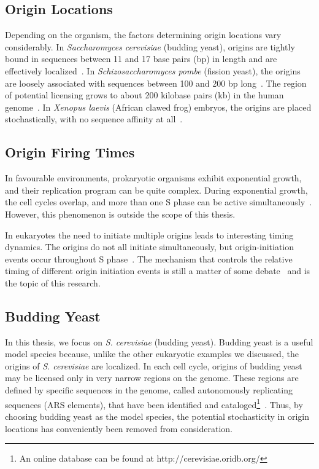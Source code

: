 	
		\subsection{Origin Locations}
		\label{subsec:OriginLocations}
		
		Depending on the organism, the factors determining origin locations vary considerably.
		In \emph{Saccharomyces cerevisiae} (budding yeast), origins are tightly bound in sequences between 11 and 17 base pairs (bp) in length and are effectively localized~\cite{ScottsPaper}.
		In \emph{Schizosaccharomyces pombe} (fission yeast), the origins are loosely associated with sequences between 100 and 200 bp long~\cite{OriginsReview}.
		The region of potential licensing grows to about 200 kilobase pairs (kb) in the human genome~\cite{HumanGenome}.
		In \emph{Xenopus laevis} (African clawed frog) embryos, the origins are placed stochastically, with no sequence affinity at all~\cite{FrogEmbryo}.
		
		
		\subsection{Origin Firing Times}
		\label{subsec:OriginTimes}
		
		In favourable environments, prokaryotic organisms exhibit exponential growth, and their replication program can be quite complex.
		During exponential growth, the cell cycles overlap, and more than one S phase can be active simultaneously~\cite{ExponentialGrowth}.
		However, this phenomenon is outside the scope of this thesis.
		
		In eukaryotes the  need to initiate multiple origins leads to interesting timing dynamics.
		The origins do not all initiate simultaneously, but origin-initiation events occur throughout S phase~\cite{DNAInitiation}.
		The mechanism that controls the relative timing of different origin initiation events is still a matter of some debate~\cite{ScottsPaper,Bechhoefer2012374,deMouraModel1,deMouraModel2} and is the topic of this research.
		
		
		\subsection{Budding Yeast}
		\label{subsec:BuddingYeast}
		
		In this thesis, we focus on \emph{S. cerevisiae} (budding yeast).
		Budding yeast is a useful model species because, unlike the other eukaryotic examples we discussed, the origins of \emph{S. cerevisiae} are localized.
		In each cell cycle, origins of budding yeast may be licensed only in very narrow regions on the genome.
		These regions are defined by specific sequences in the genome, called autonomously replicating sequences (ARS elements), that have been identified and cataloged\footnote{An online database can be found at http://cerevisiae.oridb.org/}~\cite{OriDB}.
		Thus, by choosing budding yeast as the model species, the potential stochasticity in origin locations has conveniently been removed from consideration.
		
